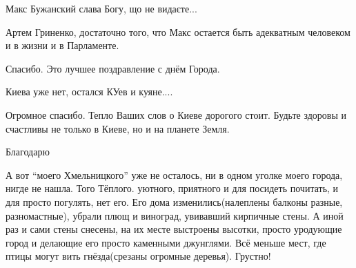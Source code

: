\begin{itemize}

Макс Бужанский слава Богу, що не видаєте...


Артем Гриненко, достаточно того, что Макс остается быть адекватным человеком и в жизни и в Парламенте.


Спасибо. Это лучшее поздравление с днём Города.


Киева уже нет, остался КУев и куяне....


Огромное спасибо. Тепло Ваших слов о Киеве дорогого стоит. Будьте здоровы и
счастливы не только в Киеве, но и на планете Земля.


Благодарю


А вот \enquote{моего Хмельницкого} уже не осталось, ни в одном уголке моего города,
нигде не нашла. Того Тёплого. уютного, приятного и для посидеть почитать, и для
просто погулять, нет его. Его дома изменились(налеплены балконы разные,
разномастные), убрали плющ и виноград, увивавший кирпичные стены. А иной раз и
сами стены снесены, на их месте выстроены высотки, просто уродующие город и
делающие его просто каменными джунглями. Всё меньше мест, где птицы могут вить
гнёзда(срезаны огромные деревья). Грустно!


\end{itemize}
